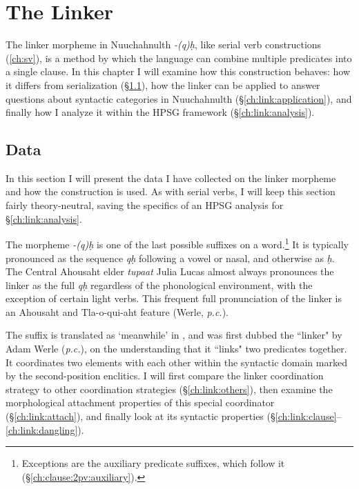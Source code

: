 \chapter{The Linker} \label{ch:link}

The linker morpheme in Nuuchahnulth \textit{-(q)ḥ}, like serial verb constructions (\cref{ch:sv}), is a method by which the language can combine multiple predicates into a single clause. In this chapter I will examine how this construction behaves: how it differs from serialization (\S\ref{ch:link:data}), how the linker can be applied to answer questions about syntactic categories in Nuuchahnulth (\S\ref{ch:link:application}), and finally how I analyze it within the HPSG framework (\S\ref{ch:link:analysis}).

\section{Data} \label{ch:link:data}

In this section I will present the data I have collected on the linker morpheme and how the construction is used. As with serial verbs, I will keep this section fairly theory-neutral, saving the specifics of an HPSG analysis for \S\ref{ch:link:analysis}.

The morpheme \textit{-(q)ḥ} is one of the last possible suffixes on a word.\footnote{Exceptions are the auxiliary predicate suffixes, which follow it (\S\ref{ch:clause:2pv:auxiliary}).} It is typically pronounced as the sequence \textit{qḥ} following a vowel or nasal, and otherwise as \textit{ḥ}. The Central Ahousaht elder \textit{tupaat} Julia Lucas almost always pronounces the linker as the full \textit{qḥ} regardless of the phonological environment, with the exception of certain light verbs. This frequent full pronunciation of the linker is an Ahousaht and Tla-o-qui-aht feature (Werle, \textit{p.c.}).

The suffix is translated as `meanwhile' in \citet{sapir1939}, and was first dubbed the ``linker" by Adam Werle (\textit{p.c.}), on the understanding that it ``links" two predicates together. It coordinates two elements with each other within the syntactic domain marked by the second-position enclitics. I will first compare the linker coordination strategy to other coordination strategies (\S\ref{ch:link:others}), then examine the morphological attachment properties of this special coordinator (\S\ref{ch:link:attach}), and finally look at its syntactic properties (\S\ref{ch:link:clause}--\ref{ch:link:dangling}).

